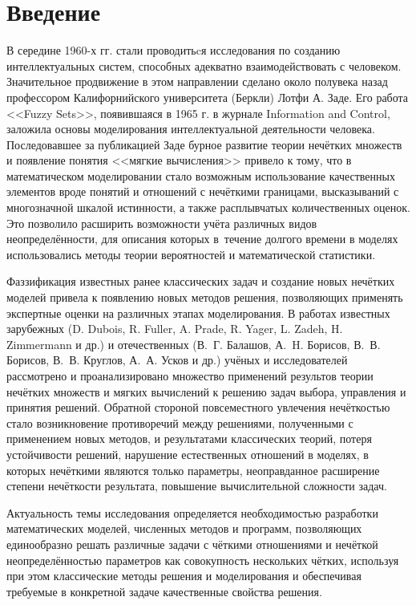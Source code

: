 \chapter*{Введение}

В середине 1960-х гг. стали проводитьcя исследования по созданию интеллектуальных систем, способных адекватно взаимодействовать с человеком. Значительное продвижение в этом направлении сделано около полувека назад профессором Калифорнийского университета (Беркли) Лотфи А. Заде. Его работа <<Fuzzy Sets>>, появившаяся в 1965 г. в журнале Information and Control, заложила основы моделирования интеллектуальной деятельности человека. Последовавшее за публикацией Заде бурное развитие теории нечётких множеств и появление понятия <<мягкие вычисления>> привело к тому, что в математическом моделировании стало возможным использование качественных элементов вроде понятий и отношений с нечёткими границами, высказываний с многозначной шкалой истинности, а также расплывчатых количественных оценок. Это позволило расширить возможности учёта различных видов неопределённости, для описания которых в~течение долгого времени в моделях использовались методы теории вероятностей и математической статистики.

Фаззификация известных ранее классических задач и создание новых нечётких моделей привела к появлению новых методов решения, позволяющих применять экспертные оценки на различных этапах моделирования. В работах известных зарубежных (D. Dubois, R. Fuller, A. Prade, R. Yager, L. Zadeh, H. Zimmermann и др.) и отечественных (В.~Г. Балашов, А.~H. Борисов, В.~В. Борисов, В.~В. Круглов, А.~А. Усков и др.) учёных и исследователей рассмотрено и проанализировано множество применений результов теории нечётких множеств и мягких вычислений к решению задач выбора, управления и принятия решений. Обратной стороной повсеместного увлечения нечёткостью стало возникновение противоречий между решениями, полученными с применением новых методов, и результатами классических теорий, потеря устойчивости решений, нарушение естественных отношений в моделях, в которых нечёткими являются только параметры, неоправданное расширение степени нечёткости результата, повышение вычислительной сложности задач.

Актуальность темы исследования определяется необходимостью разработки математических моделей, численных методов и программ, позволяющих единообразно решать различные задачи с чёткими отношениями и нечёткой неопределённостью параметров как совокупность нескольких чётких, используя при этом классические методы решения и моделирования и обеспечивая требуемые в конкретной задаче качественные свойства решения.

